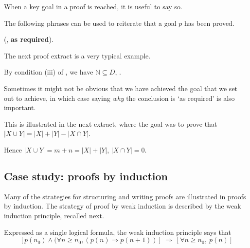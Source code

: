 When a key goal in a proof is reached, it is useful to say so.

\begin{vocabulary}
\label{vcbConclusions}
The following phrases can be used to reiterate that a goal $p$ has been proved.

\begin{vocabtemplate}
 (, \textbf{as required}).
\end{vocabtemplate}
\end{vocabulary}

The next proof extract is a very typical example.

\begin{extract}
\label{xtrConclusionExample}
By condition (iii) of , we have $\mathbb{N} \subseteq D$,  .
\end{extract}

Sometimes it might not be obvious that we have achieved the goal that we set out to achieve, in which case saying \textit{why} the conclusion is `as required' is also important.

This is illustrated in the next extract, where the goal was to prove that $|X \cup Y| = |X| + |Y| - |X \cap Y|$.

\begin{extract}
\label{xtrConclusionExampleTwo}
Hence $|X \cup Y| = m+n = |X| + |Y|$,  $|X \cap Y| = 0$.
\end{extract}

\subsection*{Case study: proofs by induction}

Many of the strategies for structuring and writing proofs are illustrated in proofs by induction. The strategy of proof by weak induction is described by the weak induction principle, recalled next.

\rthmWeakInduction*

Expressed as a single logical formula, the weak induction principle says that
\[ [p(n_0) \wedge (\forall n \ge n_0, (p(n) \Rightarrow p(n+1))]~\Rightarrow~[\forall n \ge n_0,~p(n)] \]

